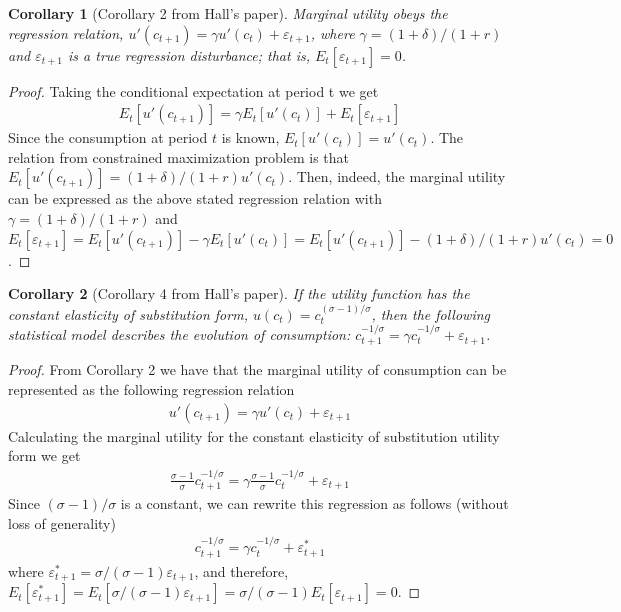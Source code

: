 \documentclass[11pt]{article}
\newtheorem*{corollary}{Corollary}
\begin{document}
\begin{enumerate}
\begin{corollary}[Corollary 2 from Hall's paper]
Marginal utility obeys the regression relation, $u'(c_{t+1}) = \gamma u'(c_t) + \varepsilon_{t+1}$, where $\gamma = (1+\delta)/(1+r)$ and $\varepsilon_{t+1}$ is a true regression disturbance; that is, $E_t [\varepsilon_{t+1}] = 0$.
\end{corollary}

\begin{proof}
Taking the conditional expectation at period t we get
\begin{align*}
     E_t [u'(c_{t+1})] =  \gamma E_t [u'(c_t)] + E_t[\varepsilon_{t+1}]
\end{align*}
Since the consumption at period $t$ is known, $E_t [u'(c_t)] = u'(c_t)$. The relation from constrained maximization problem is that $E_t [u'(c_{t+1})] =  (1+\delta)/(1+r) u'(c_t)$. Then, indeed, the marginal utility can be expressed as the above stated regression relation with $\gamma = (1+\delta)/(1+r)$ and $E_t[\varepsilon_{t+1}] = E_t [u'(c_{t+1})] -  \gamma E_t [u'(c_t)] = E_t [u'(c_{t+1})] - (1+\delta)/(1+r) u'(c_t)=0$.
\end{proof}

\begin{corollary}[Corollary 4 from Hall's paper]
If the utility function has the constant elasticity of substitution form, $u(c_t) = c_t^{(\sigma-1)/\sigma}$, then the following statistical model describes the evolution of consumption: $c_{t+1}^{-1/\sigma} = \gamma c_t^{-1/\sigma} + \varepsilon_{t+1}$.
\end{corollary}

\begin{proof}
From Corollary 2 we have that the marginal utility of consumption can be represented as the following regression relation
\begin{align*}
    u'(c_{t+1}) = \gamma u'(c_t) + \varepsilon_{t+1}
\end{align*}
Calculating the marginal utility for the constant elasticity of substitution utility form we get
\begin{align*}
    \frac{\sigma-1}{\sigma} c_{t+1}^{-1/\sigma} = \gamma \frac{\sigma-1}{\sigma} c_t^{-1/\sigma} + \varepsilon_{t+1}
\end{align*}
Since $(\sigma-1)/\sigma$ is a constant, we can rewrite this regression as follows (without loss of generality)
\begin{align*}
    c_{t+1}^{-1/\sigma} = \gamma c_t^{-1/\sigma} + \varepsilon_{t+1}^*
\end{align*}
where $\varepsilon_{t+1}^* = \sigma/(\sigma-1) \varepsilon_{t+1}$, and therefore, $E_t[\varepsilon_{t+1}^*] = E_t[\sigma/(\sigma-1) \varepsilon_{t+1}] = \sigma/(\sigma-1) E_t[\varepsilon_{t+1}] = 0$.
\end{proof}


\end{enumerate}
\end{document}
